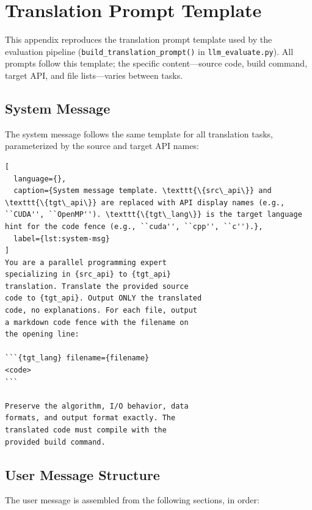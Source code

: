 \clearpage %
\section{Translation Prompt Template}
\label{sec:appendix-g}

This appendix reproduces the translation prompt template used by the evaluation pipeline (\texttt{build\_translation\_prompt()} in \texttt{llm\_evaluate.py}). All prompts follow this template; the specific content---source code, build command, target API, and file lists---varies between tasks.

\subsection{System Message}

The system message follows the same template for all translation tasks, parameterized by the source and target API names:

\begin{lstlisting}[
  language={},
  caption={System message template. \texttt{\{src\_api\}} and \texttt{\{tgt\_api\}} are replaced with API display names (e.g., ``CUDA'', ``OpenMP''). \texttt{\{tgt\_lang\}} is the target language hint for the code fence (e.g., ``cuda'', ``cpp'', ``c'').},
  label={lst:system-msg}
]
You are a parallel programming expert
specializing in {src_api} to {tgt_api}
translation. Translate the provided source
code to {tgt_api}. Output ONLY the translated
code, no explanations. For each file, output
a markdown code fence with the filename on
the opening line:

```{tgt_lang} filename={filename}
<code>
```

Preserve the algorithm, I/O behavior, data
formats, and output format exactly. The
translated code must compile with the
provided build command.
\end{lstlisting}

\subsection{User Message Structure}

The user message is assembled from the following sections, in order:

